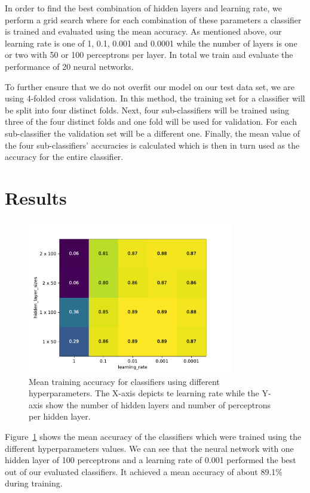 \documentclass[sigconf]{acmart}
\begin{document}
In order to find the best combination of hidden layers and learning rate, we perform a grid search where for each combination of these parameters a classifier is trained and evaluated using the mean accuracy. As mentioned above, our learning rate is one of 1, 0.1, 0.001 and 0.0001 while the number of layers is one or two with 50 or 100 perceptrons per layer. In total we train and evaluate the performance of 20 neural networks.

To further ensure that we do not overfit our model on our test data set, we are using 4-folded cross validation. In this method, the training set for a classifier will be split into four distinct folds. Next, four sub-classifiers will be trained using three of the four distinct folds and one fold will be used for validation. For each sub-classifier the validation set will be a different one. Finally, the mean value of the four sub-classifiers' accuracies is calculated which is then in turn used as the accuracy for the entire classifier\cite{introduction_ml}.

\section{Results}

\begin{figure}
	\centering
	\includegraphics[width=9cm]{fig2.pdf}
	\caption{Mean training accuracy for classifiers using different hyperparameters. The X-axis depicts te learning rate while the Y-axis show the number of hidden layers and number of perceptrons per hidden layer.}
	\label{fig:heatmap}
\end{figure}


Figure~\ref{fig:heatmap} shows the mean accuracy of the classifiers which were trained using the different hyperparameters values. We can see that the neural network with one hidden layer of 100 perceptrons and a learning rate of 0.001 performed the best out of our evaluated classifiers. It achieved a mean accuracy of about 89.1\% during training. 
\end{document}
